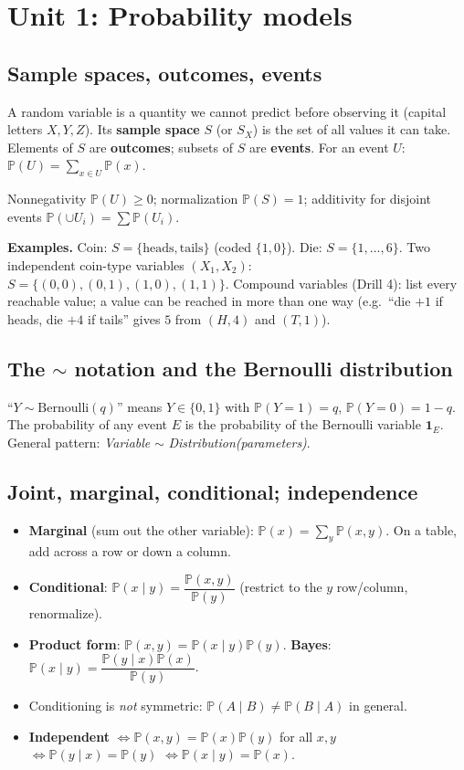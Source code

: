\documentclass[11pt]{article}
\renewcommand{\P}{\mathbb{P}}
\newcommand{\given}{\mid}
\newcommand{\Bern}{\text{Bernoulli}}
\begin{document}
\section{Unit 1: Probability models}

\subsection{Sample spaces, outcomes, events}
A random variable is a quantity we cannot predict before observing it (capital letters $X,Y,Z$). Its \textbf{sample space}
$S$ (or $S_X$) is the set of all values it can take. Elements of $S$ are \textbf{outcomes}; subsets of $S$ are \textbf{events}.
For an event $U$: $\P(U)=\sum_{x\in U}\P(x)$.

\begin{keybox}[title={Axioms}]
Nonnegativity $\P(U)\ge 0$; normalization $\P(S)=1$; additivity for disjoint events $\P(\cup U_i)=\sum\P(U_i)$.
\end{keybox}

\textbf{Examples.} Coin: $S=\{\text{heads},\text{tails}\}$ (coded $\{1,0\}$). Die: $S=\{1,\dots,6\}$. Two independent coin-type
variables $(X_1,X_2)$: $S=\{(0,0),(0,1),(1,0),(1,1)\}$. Compound variables (Drill 4): list every reachable value; a value can be reached
in more than one way (e.g.\ ``die $+1$ if heads, die $+4$ if tails'' gives $5$ from $(H,4)$ and $(T,1)$).

\subsection{The $\sim$ notation and the Bernoulli distribution}
``$Y\sim\Bern(q)$'' means $Y\in\{0,1\}$ with $\P(Y=1)=q$, $\P(Y=0)=1-q$. The probability of any event $E$ is the
probability of the Bernoulli variable $\mathbf 1_E$. General pattern: \emph{Variable} $\sim$ \emph{Distribution(parameters)}.

\subsection{Joint, marginal, conditional; independence}
\begin{itemize}[leftmargin=*,itemsep=2pt]
  \item \textbf{Marginal} (sum out the other variable): $\P(x)=\sum_y\P(x,y)$. On a table, add across a row or down a column.
  \item \textbf{Conditional}: $\P(x\given y)=\dfrac{\P(x,y)}{\P(y)}$ (restrict to the $y$ row/column, renormalize).
  \item \textbf{Product form}: $\P(x,y)=\P(x\given y)\P(y)$. \textbf{Bayes}: $\P(x\given y)=\dfrac{\P(y\given x)\P(x)}{\P(y)}$.
  \item Conditioning is \emph{not} symmetric: $\P(A\given B)\neq\P(B\given A)$ in general.
  \item \textbf{Independent} $\iff\P(x,y)=\P(x)\P(y)$ for all $x,y$ $\iff\P(y\given x)=\P(y)$ $\iff\P(x\given y)=\P(x)$.
\end{itemize}
\end{document}
